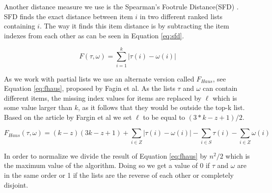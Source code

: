 Another distance measure we use is the Spearman's Footrule Distance(SFD) \cite{comparing:topk}. SFD finds the exact distance between item $i$ in two different ranked lists containing $i$. The way it finds this item distance is by subtracting the item indexes from each other as can be seen in Equation \ref{eq:sfd}. 

\begin{equation}\label{eq:sfd}
F(\tau, \omega) = \sum_{i=1}^{k} | \tau (i) - \omega (i) |
\end{equation}

As we work with partial lists we use an alternate version called $F_{Haus}$, see Equation \ref{eq:fhaus}, proposed by Fagin et al\citep{comparing:topk}.
As the lists $\tau$ and $\omega$ can contain different items, the missing index values for items are replaced by $\ell$ which is some value larger than $k$, as it follows that they would be outside the top-k list. Based on the article by Fargin et al we set $\ell$ to be equal to $(3 * k - z + 1)/2$.

\footnotesize
\begin{equation}\label{eq:fhaus}
F_{Haus}(\tau,\omega)= (k-z)(3k-z+1)+\sum_{i\in Z} | \tau (i) - \omega (i) | - \sum_{i\in S} \tau (i) - \sum_{i\in Z} \omega(i)
\end{equation}
\normalsize

In order to normalize we divide the result of Equation \ref{eq:fhaus} by $n^2 /2$ which is the maximum value of the algorithm. Doing so we get a value of 0 if $\tau$ and $\omega$ are in the same order or 1 if the lists are the reverse of each other or completely disjoint.